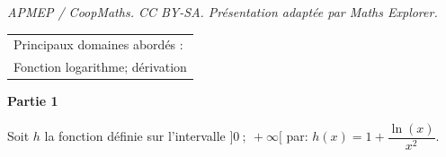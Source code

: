 \documentclass[10pt]{article}
\begin{document}
\noindent\textit{APMEP / CoopMaths. CC BY-SA. Présentation adaptée par Maths Explorer.}\par\medskip
\smallskip

\begin{tabular}{|l|}\hline
Principaux domaines abordés :\\
Fonction logarithme; dérivation\\ \hline
\end{tabular}

\begin{center}\textbf{Partie 1}\end{center}

Soit $h$ la fonction définie sur l'intervalle $]0~;~ +\infty[$ par:
$h(x) = 1 + \dfrac{\ln (x)}{x^2}.$



\medskip
\end{document}
